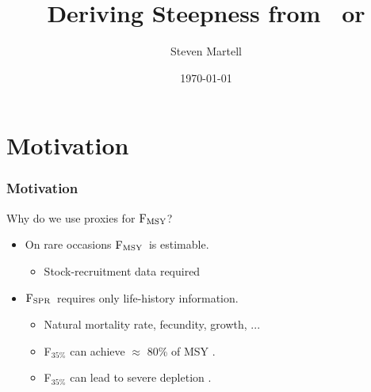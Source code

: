 \documentclass{beamer}
\title[Steepness]{Deriving Steepness from \fmsy\ or \fspr}
\author{Steven Martell}
\institute[UBC]
{
University of British Columbia \\
\medskip
{\emph{s.martell@mail.ubc.ca}}
}
\date{\today}
\newcommand{\fmsy}{$\rm{F_{MSY}}$}
\newcommand{\fspr}{$\rm{F_{SPR}}$}
\begin{document}
%
\begin{frame}
\titlepage
\end{frame}
%
\section{Motivation} %
\label{sec:motivation}

\begin{frame}
\frametitle{Motivation}
\begin{block}
{Why do we use proxies for \fmsy?}
\end{block}
\begin{itemize}
	\item<+-> On rare occasions \fmsy\ is estimable.
	\begin{itemize}
		\item Stock-recruitment data required
	\end{itemize}
	\item<+-> \fspr\ requires only life-history information.
	\begin{itemize}
		\item Natural mortality rate, fecundity, growth, ...
		\item<+-> F$_{35\%}$ can achieve $\approx$ 80\% of MSY \cite{clark1991groundfish}.
		\item<+-> F$_{35\%}$ can lead to severe depletion \cite{clark2002f}.
	\end{itemize}
\end{itemize}
\end{frame}
%
%
%
%
\end{document}
